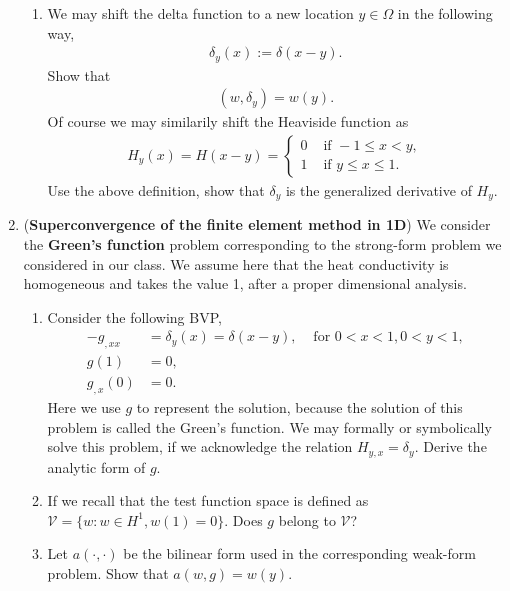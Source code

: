 \documentclass[12pt]{article}
\begin{document}
\begin{enumerate}
\begin{enumerate}
\item We may shift the delta function to a new location $y \in \Omega$ in the following way,
\begin{align*}
\delta_y(x) := \delta(x-y).
\end{align*}
Show that 
\begin{align*}
\left( w, \delta_y \right) = w(y).
\end{align*}
Of course we may similarily shift the Heaviside function as
\begin{align*}
H_y(x) = H(x-y) = \begin{cases}
0 & \text{ if } -1 \leq x < y, \\
1 & \text{ if } y \leq x \leq 1.
\end{cases}
\end{align*}
Use the above definition, show that $\delta_y$ is the generalized derivative of $H_y$.
\end{enumerate} 

\item (\textbf{Superconvergence of the finite element method in 1D}) We consider the \textbf{Green's function} problem corresponding to the strong-form problem we considered in our class. We assume here that the heat conductivity is homogeneous and takes the value 1, after a proper dimensional analysis.
\begin{enumerate}
\item Consider the following BVP,
\begin{align*}
-g_{,xx} &= \delta_y(x) = \delta(x-y), &\mbox{ for } 0 < x < 1, 0 < y < 1, \\
g(1) &= 0, & \\
g_{,x}(0) &= 0. & 
\end{align*}
Here we use $g$ to represent the solution, because the solution of this problem is called the Green's function. We may formally or symbolically solve this problem, if we acknowledge the relation $H_{y,x} = \delta_y$. Derive the analytic form of $g$.

\item If we recall that the test function space is defined as $\mathcal V = \lbrace w : w \in H^1, w(1) = 0 \rbrace$. Does $g$ belong to $\mathcal V$?

\item Let $a(\cdot, \cdot)$ be the bilinear form used in the corresponding weak-form problem. Show that $a(w,g) = w(y)$.


\end{enumerate}
\end{enumerate}
\end{document}
